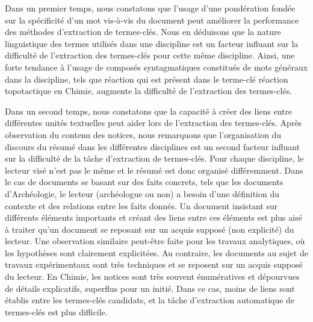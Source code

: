   Dans un premier temps, nous constatons que l'usage d'une pondération fondée
  sur la spécificité d'un mot vis-à-vis du document
  peut améliorer la performance des méthodes d'extraction de termes-clés. Nous
  en déduisons que la nature linguistique des termes utilisés dans une
  discipline est un facteur influant sur la difficulté de l'extraction des
  termes-clés pour cette même discipline. Ainsi, une forte tendance à l'usage de
  composés syntagmatiques constitués de mots généraux dans la discipline, tels
  que \og{}réaction\fg{} qui est présent dans le terme-clé \og{}réaction
  topotactique\fg{} en Chimie, augmente la difficulté de l'extraction des
  termes-clés.

  Dans un second temps, nous constatons que la capacité à créer des liens entre
  différentes unités textuelles peut aider lors de l'extraction des termes-clés.
  Après observation du contenu des notices, nous remarquons que l'organisation
  du discours du résumé dans les différentes disciplines est un second facteur
  influant sur la difficulté de la tâche d'extraction de termes-clés. Pour
  chaque discipline, le lecteur visé n'est pas le même et le résumé est donc
  organisé différemment. Dans le cas de documents se basant sur des faits
  concrets, tels que les documents d'Archéologie, le lecteur (archéologue ou
  non) a besoin d'une définition du contexte et des relations entre les faits
  donnés. Un document insistant sur différents éléments importants et créant des
  liens entre ces éléments est plus aisé à traiter qu'un document se reposant
  sur un acquis supposé (non explicité) du lecteur. Une observation similaire
  peut-être faite pour les travaux analytiques, où les hypothèses sont
  clairement explicitées. Au contraire, les documents au sujet de travaux
  expérimentaux sont très techniques et se reposent sur un acquis supposé du
  lecteur. En Chimie, les notices sont très souvent énumératives et dépourvues
  de détails explicatifs, superflus pour un initié. Dans ce cas, moins de liens
  sont établis entre les termes-clés candidats, et la tâche d'extraction
  automatique de termes-clés est plus difficile.

